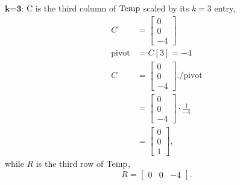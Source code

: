 $\textbf{k=3:}$ C is the third column of ${\rm Temp}$ scaled by its $k=3$ entry,
\begin{align*}
    C &= \left[ \begin{array}{r} 0 \\ 0 \\ -4 \end{array} \right] \\
    \textrm{pivot} &= C[3] = -4 \\
    C &= \left[ \begin{array}{r} 0 \\ 0 \\ -4 \end{array} \right] .\slash \textrm{pivot} \\
    &= \left[ \begin{array}{r} 0 \\ 0 \\ -4 \end{array} \right] \cdot \frac{1}{-4} \\ 
    &= \left[ \begin{array}{r} 0 \\ 0 \\ 1 \end{array} \right],
\end{align*}
while $R$ is the third row of $\rm Temp$,
$$ R = \left[ \begin{array}{rrr} 0 & 0 & -4 \end{array} \right]. $$

